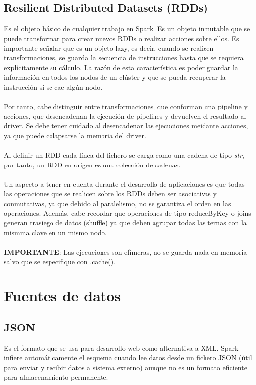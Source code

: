 \subsection{Resilient Distributed Datasets (RDDs)}
Es el objeto básico de cualquier trabajo en Spark. Es un objeto inmutable que se puede transformar para crear nuevos RDDs o realizar acciones sobre ellos. Es importante señalar que es un objeto lazy, es decir, cuando se realicen transformaciones, se guarda la secuencia de instrucciones hasta que se requiera explícitamente su cálculo. La razón de esta característica es poder guardar la información en todos los nodos de un clúster y que se pueda recuperar la instrucción si se cae algún nodo.\\\\
Por tanto, cabe distinguir entre transformaciones, que conforman una pipeline y acciones, que desencadenan la ejecución de pipelines y devuelven el resultado al driver. Se debe tener cuidado al desencadenar las ejecuciones meidante acciones, ya que puede colapsarse la memoria del driver.\\\\
Al definir un RDD cada línea del fichero se carga como una cadena de tipo \textit{str}, por tanto, un RDD en origen es una colección de cadenas.\\\\
Un aspecto a tener en cuenta durante el desarrollo de aplicaciones es que todas las operaciones que se realicen sobre los RDDs deben ser asociativas y conmutativas, ya que debido al paralelismo, no se garantiza el orden en las operaciones. Además, cabe recordar que operaciones de tipo reduceByKey o joins generan trasiego de datos (shuffle) ya que deben agrupar todas las ternas con la mismma clave en un mismo nodo.\\\\
\textbf{IMPORTANTE}: Las ejecuciones son efímeras, no se guarda nada en memoria salvo que se especifique con .cache().
\section{Fuentes de datos}
\subsection{JSON}
Es el formato que se usa para desarrollo web como alternativa a XML. Spark infiere automáticamente el esquema cuando lee datos desde un fichero JSON (útil para enviar y recibir datos a sistema externo) aunque no es un formato eficiente para almacenamiento permanente. 

